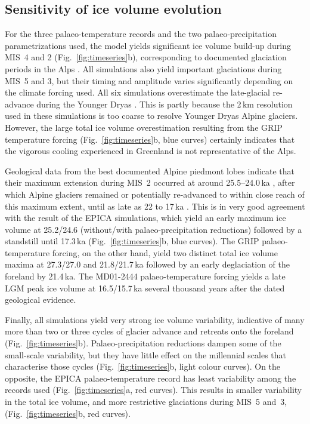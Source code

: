 \documentclass[tc, manuscript]{copernicus}
\newcommand{\todo}[1]{\textcolor{darkred}{\emph{[\textbf{TODO:} #1]}}}
\begin{document}
\subsection{Sensitivity of ice volume evolution}
\label{sec:timeseries}

    For the three palaeo-temperature records and the two palaeo-precipitation
    parametrizations used, the model yields significant ice volume build-up
    during MIS~4 and 2 (Fig.~\ref{fig:timeseries}b), corresponding to documented
    glaciation periods in the Alps \citep{Preusser.2004, Ivy-Ochs.etal.2008}.
    All simulations also yield important glaciations during MIS~5 and 3, but
    their timing and amplitude varies significantly depending on the climate
    forcing used. All six simulations overestimate the late-glacial re-advance
    during the Younger Dryas
    \citep[\todo{timing}, cf. e.g.,][]{Ivy-Ochs.etal.2009}.
    This is partly because the 2\,km resolution used in these simulations is
    too coarse to resolve
    Younger Dryas Alpine glaciers. However, the large total ice volume
    overestimation resulting from the GRIP temperature forcing
    (Fig.~\ref{fig:timeseries}b, blue curves) certainly indicates that the
    vigorous cooling experienced in Greenland is not representative of the
    Alps.

    Geological data from the best documented Alpine piedmont lobes indicate
    that their maximum extension during MIS~2 occurred at around 25.5--24.0\,ka
    \citep{Monegato.etal.2017}, after which Alpine glaciers remained or
    potentially re-advanced to within close reach of this maximum extent, until
    as late as 22 to 17\,ka \citep[Fig.~5]{Wirsig.etal.2016}. This is in very
    good agreement with the result of the EPICA simulations, which yield an
    early maximum ice volume at 25.2/24.6 (without/with palaeo-precipitation
    reductions) followed by a standstill until 17.3\,ka
    (Fig.~\ref{fig:timeseries}b, blue curves). The GRIP palaeo-temperature
    forcing, on the other hand, yield two distinct total ice volume maxima
    at 27.3/27.0 and 21.8/21.7\,ka followed by an early deglaciation of the
    foreland by 21.4\,ka. The MD01-2444 palaeo-temperature forcing yields
    a late LGM peak ice volume at 16.5/15.7\,ka several thousand years after
    the dated geological evidence.

    Finally, all simulations yield very strong ice volume
    variability, indicative of many more than two or three cycles of glacier
    advance and retreats onto the foreland (Fig.~\ref{fig:timeseries}b).
    Palaeo-precipitation reductions dampen some of the small-scale variability,
    but they have little effect on the millennial scales that characterise those
    cycles (Fig.~\ref{fig:timeseries}b, light colour curves). On the opposite,
    the EPICA palaeo-temperature record has least variability among the records
    used (Fig.~\ref{fig:timeseries}a, red curves). This results in smaller
    variability in the total ice volume, and more restrictive glaciations
    during MIS~5 and~3, (Fig.~\ref{fig:timeseries}b, red curves).
\end{document}
